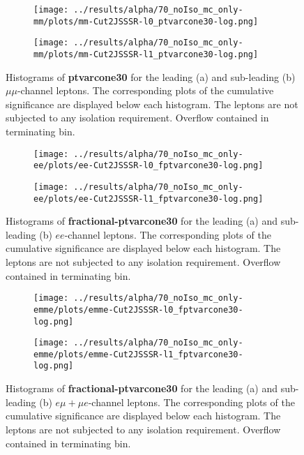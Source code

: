 \begin{figure}
\centering
\begin{subfigure}{.65\textwidth}
  \centering
  \texttt{[image: ../results/alpha/70\_noIso\_mc\_only-mm/plots/mm-Cut2JSSSR-l0\_ptvarcone30-log.png]}
  \caption{}
  \label{mm_leading_topoetcone}
\end{subfigure}
\begin{subfigure}{.65\textwidth}
 \centering
  \texttt{[image: ../results/alpha/70\_noIso\_mc\_only-mm/plots/mm-Cut2JSSSR-l1\_ptvarcone30-log.png]}
  \caption{}
  \label{mm_subleading_topoetcone}
\end{subfigure}
\caption{Histograms of \textbf{ptvarcone30} for the leading (a) and sub-leading (b) $\mu\mu$-channel leptons. The corresponding plots of the cumulative significance are displayed below each histogram. The leptons are not subjected to any isolation requirement. Overflow contained in terminating bin.}
\label{ptvarcone30_isoplots_noIso_mm}
\end{figure}
\begin{figure}
\centering
\begin{subfigure}{.65\textwidth}
  \centering
  \texttt{[image: ../results/alpha/70\_noIso\_mc\_only-ee/plots/ee-Cut2JSSSR-l0\_fptvarcone30-log.png]}
  \caption{}
  \label{ee_leading_topoetcone}
\end{subfigure}
\begin{subfigure}{.65\textwidth}
 \centering
  \texttt{[image: ../results/alpha/70\_noIso\_mc\_only-ee/plots/ee-Cut2JSSSR-l1\_fptvarcone30-log.png]}
  \caption{}
  \label{emme_subleading_topoetcone}
\end{subfigure}
\caption{Histograms of \textbf{fractional-ptvarcone30} for the leading (a) and sub-leading (b) $ee$-channel leptons. The corresponding plots of the cumulative significance are displayed below each histogram.  The leptons are not subjected to any isolation requirement. Overflow contained in terminating bin.}
\label{fptvarcone30_isoplots_noIso_ee}
\end{figure}
\begin{figure}
\centering
\begin{subfigure}{.65\textwidth}
  \centering
  \texttt{[image: ../results/alpha/70\_noIso\_mc\_only-emme/plots/emme-Cut2JSSSR-l0\_fptvarcone30-log.png]}
  \caption{}
  \label{emme_leading_topoetcone}
\end{subfigure}
\begin{subfigure}{.65\textwidth}
 \centering
  \texttt{[image: ../results/alpha/70\_noIso\_mc\_only-emme/plots/emme-Cut2JSSSR-l1\_fptvarcone30-log.png]}
  \caption{}
  \label{emme_subleading_topoetcone}
\end{subfigure}
\caption{Histograms of \textbf{fractional-ptvarcone30} for the leading (a) and sub-leading (b) $e\mu+\mu e$-channel leptons. The corresponding plots of the cumulative significance are displayed below each histogram.  The leptons are not subjected to any isolation requirement. Overflow contained in terminating bin.}
\label{fptvarcone30_isoplots_noIso_emme}
\end{figure}
